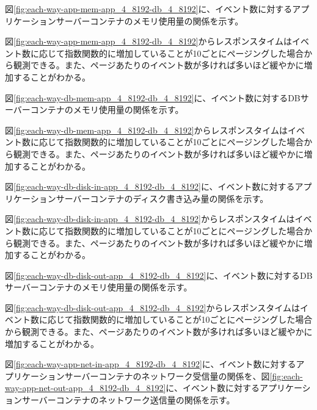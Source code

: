 \documentclass[../../../../main]{subfiles}
\begin{document}
    図\ref{fig:each-way-app-mem-app_4_8192-db_4_8192}に、イベント数に対するアプリケーションサーバーコンテナのメモリ使用量の関係を示す。

    

    図\ref{fig:each-way-app-mem-app_4_8192-db_4_8192}からレスポンスタイムはイベント数に応じて指数関数的に増加していることが10ごとにページングした場合から観測できる。また、ページあたりのイベント数が多ければ多いほど緩やかに増加することがわかる。

    図\ref{fig:each-way-db-mem-app_4_8192-db_4_8192}に、イベント数に対するDBサーバーコンテナのメモリ使用量の関係を示す。

    

    図\ref{fig:each-way-db-mem-app_4_8192-db_4_8192}からレスポンスタイムはイベント数に応じて指数関数的に増加していることが10ごとにページングした場合から観測できる。また、ページあたりのイベント数が多ければ多いほど緩やかに増加することがわかる。

    \label{subsubsubsec:result-each-way-only-limit-disk-io}

    図\ref{fig:each-way-db-disk-in-app_4_8192-db_4_8192}に、イベント数に対するアプリケーションサーバーコンテナのディスク書き込み量の関係を示す。

    

    図\ref{fig:each-way-db-disk-in-app_4_8192-db_4_8192}からレスポンスタイムはイベント数に応じて指数関数的に増加していることが10ごとにページングした場合から観測できる。また、ページあたりのイベント数が多ければ多いほど緩やかに増加することがわかる。

    図\ref{fig:each-way-db-disk-out-app_4_8192-db_4_8192}に、イベント数に対するDBサーバーコンテナのメモリ使用量の関係を示す。

    

    図\ref{fig:each-way-db-disk-out-app_4_8192-db_4_8192}からレスポンスタイムはイベント数に応じて指数関数的に増加していることが10ごとにページングした場合から観測できる。また、ページあたりのイベント数が多ければ多いほど緩やかに増加することがわかる。

    \label{subsubsubsec:result-each-way-only-limit-net-io}

    図\ref{fig:each-way-app-net-in-app_4_8192-db_4_8192}に、イベント数に対するアプリケーションサーバーコンテナのネットワーク受信量の関係を、図\ref{fig:each-way-app-net-out-app_4_8192-db_4_8192}に、イベント数に対するアプリケーションサーバーコンテナのネットワーク送信量の関係を示す。

    
    
\end{document}

